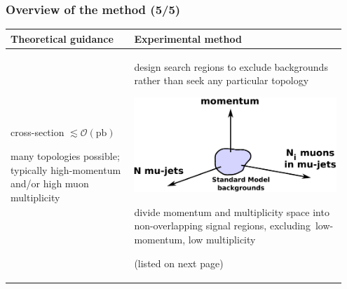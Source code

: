 \documentclass[compress]{beamer}
\begin{document}
\begin{frame}
\frametitle{Overview of the method (5/5)}

\renewcommand{\arraystretch}{1.7}
\begin{tabular}{p{0.35\linewidth} | p{0.6\linewidth}}
Theoretical guidance & Experimental method \\\hline

cross-section $\lesssim \mathcal{O}(\mbox{pb})$

\vspace{0.25 cm}
many topologies possible; typically high-momentum and/or high muon multiplicity & design search regions to exclude backgrounds rather than seek any particular topology

\begin{center}
\includegraphics[width=0.8\linewidth]{signal_regions.pdf}
\end{center}

divide momentum and multiplicity space into non-overlapping signal regions, \mbox{excluding low-momentum,} low multiplicity

\vspace{0.25 cm}
(listed on next page)
\end{tabular}
\end{frame}
\end{document}
